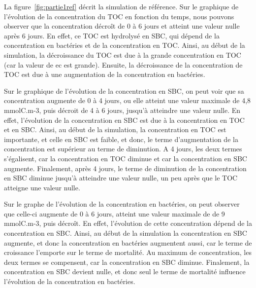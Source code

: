 \par{
La figure~\ref{fig:partie1ref} décrit la simulation de référence. 
Sur le graphique de l'\'evolution de la concentration du TOC en fonction du temps, nous pouvons observer que
la concentration d\'ecro\^it de 0 \`a 6 jours et atteint une valeur nulle apr\`es 6 jours. En effet, ce TOC
est hydrolys\'e en SBC, qui d\'epend de la concentration en bact\'eries et de la concentration en TOC. Ainsi,
au d\'ebut de la simulation, la d\'ecroissance du TOC est due \`a la grande concentration en TOC (car la
valeur de ec est grande). Ensuite, la d\'ecroissance de la concentration de TOC est due \`a une augmentation
de la concentration en bact\'eries.
}
\par{
Sur le graphique de l'\'evolution de la concentration en SBC, on peut voir que sa concentration augmente de
0 \`a 4 jours, ou elle atteint une valeur maximale de 4,8 mmolC.m-3, puis d\'ecroit de 4 \`a 6 jours,
jusqu'\`a atteindre une valeur nulle. En effet, l'\'evolution de la concentration en SBC est due \`a la
concentration en TOC et en SBC. Ainsi, au d\'ebut de la simulation, la concentration en TOC est importante,
et celle en SBC est faible, et donc, le terme d'augmentation de la concentration est sup\'erieur au terme de
diminution. A 4 jours, les deux termes s'\'egalisent, car la concentration en TOC diminue et car la
concentration en SBC augmente. Finalement, apr\`es 4 jours, le terme de diminution de la concentration en SBC
diminue jusqu'\`a atteindre une valeur nulle, un peu apr\`es que le TOC atteigne une valeur nulle.
}
\par{
Sur le graphe de l'\'evolution de la concentration en bact\'eries, on peut observer que celle-ci augmente de
0 \`a 6 jours, atteint une valeur maximale de de 9 mmolC.m-3, puis d\'ecro\^it. En effet, l'\'evolution de
cette concentration d\'epend de la concentration en SBC. Ainsi, au d\'ebut de la simulation la concentration
en SBC augmente, et donc la concentration en bact\'eries augmentent aussi, car le terme de croissance
l'emporte sur le terme de mortalit\'e. Au maximum de concentration, les deux termes se compensent, car la
concentration en SBC diminue. Finalement, la concentration en SBC devient nulle, et donc seul le terme de
mortalit\'e influence l'\'evolution de la concentration en bact\'eries.
}
